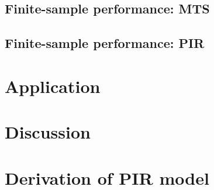 \documentclass[man, noextraspace, floatsintext]{apa6}\usepackage[]{graphicx}\usepackage[]{color}
\newcommand{\bibfile}{C:/Users/jep2963/Documents/Bibliography/Behavioral_observation-APP}
\begin{document}
\subsection{Finite-sample performance: MTS}

\subsection{Finite-sample performance: PIR}

\section{Application}
\label{sec:application}

\section{Discussion}
\label{sec:discussion}



 
\appendix

\section{Derivation of PIR model}
\label{app:PIR_derivation}
\end{document}
